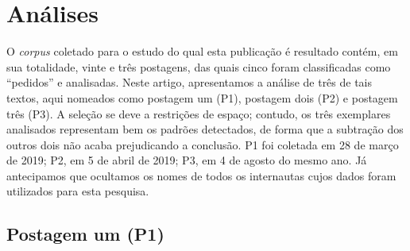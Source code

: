 \documentclass{textolivre}
\begin{document}
\section{Análises}\label{sec-analises}
O \textit{corpus} coletado para o estudo do qual esta publicação é resultado contém, em sua totalidade, vinte e três postagens, das quais cinco foram classificadas como “pedidos” e analisadas. Neste artigo, apresentamos a análise de três de tais textos, aqui nomeados como postagem um (P1), postagem dois (P2) e postagem três (P3). A seleção se deve a restrições de espaço; contudo, os três exemplares analisados representam bem os padrões detectados, de forma que a subtração dos outros dois não acaba prejudicando a conclusão. P1 foi coletada em 28 de março de 2019; P2, em 5 de abril de 2019; P3, em 4 de agosto do mesmo ano. Já antecipamos que ocultamos os nomes de todos os internautas cujos dados foram utilizados para esta pesquisa.

\subsection{Postagem um (P1)}\label{sec-postagem1}
\end{document}
